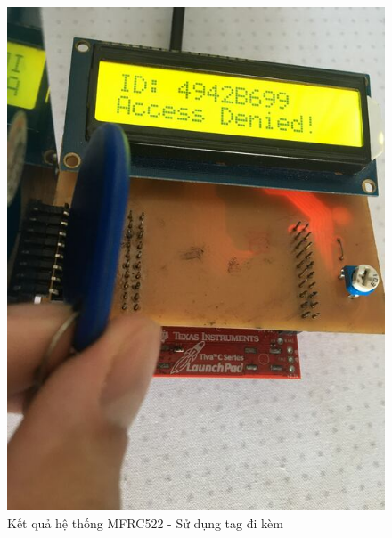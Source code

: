 \begin{figure}[ht]
\centering
\includegraphics[scale=0.3]{images/mfrc522_tag.jpg}
\caption{Kết quả hệ thống MFRC522 - Sử dụng tag đi kèm}
\label{fig:rc522_tag}
\end{figure}

